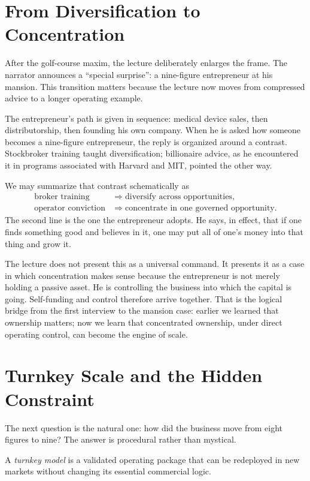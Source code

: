 \section{From Diversification to Concentration}

After the golf-course maxim, the lecture deliberately enlarges the frame. The narrator announces a ``special surprise'': a nine-figure entrepreneur at his mansion. This transition matters because the lecture now moves from compressed advice to a longer operating example.

The entrepreneur's path is given in sequence: medical device sales, then distributorship, then founding his own company. When he is asked how someone becomes a nine-figure entrepreneur, the reply is organized around a contrast. Stockbroker training taught diversification; billionaire advice, as he encountered it in programs associated with Harvard and MIT, pointed the other way.

We may summarize that contrast schematically as
\begin{align}
\text{broker training} &\Rightarrow \text{diversify across opportunities},\\
\text{operator conviction} &\Rightarrow \text{concentrate in one governed opportunity}.
\end{align}
The second line is the one the entrepreneur adopts. He says, in effect, that if one finds something good and believes in it, one may put all of one's money into that thing and grow it.

The lecture does not present this as a universal command. It presents it as a case in which concentration makes sense because the entrepreneur is not merely holding a passive asset. He is controlling the business into which the capital is going. Self-funding and control therefore arrive together. That is the logical bridge from the first interview to the mansion case: earlier we learned that ownership matters; now we learn that concentrated ownership, under direct operating control, can become the engine of scale.

\section{Turnkey Scale and the Hidden Constraint}

The next question is the natural one: how did the business move from eight figures to nine? The answer is procedural rather than mystical.

\begin{definition}
A \emph{turnkey model} is a validated operating package that can be redeployed in new markets without changing its essential commercial logic.
\end{definition}

